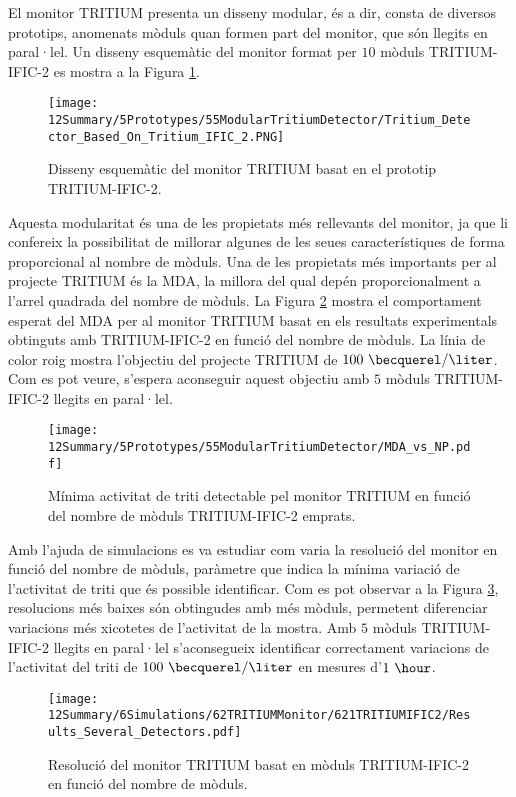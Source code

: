 El monitor TRITIUM presenta un disseny modular, és a dir, consta de diversos prototips, anomenats mòduls quan formen part del monitor, que són llegits en paral·lel. Un disseny esquemàtic del monitor format per $10$ mòduls TRITIUM-IFIC-2 es mostra a la Figura \ref{fig:10TritiumMonitorIFIC2}.
\begin{figure}[h]
\centering
\texttt{[image: 12Summary/5Prototypes/55ModularTritiumDetector/Tritium\_Detector\_Based\_On\_Tritium\_IFIC\_2.PNG]}
\caption{Disseny esquemàtic del monitor TRITIUM basat en el prototip TRITIUM-IFIC-2.\label{fig:10TritiumMonitorIFIC2}}
\end{figure}
Aquesta modularitat és una de les propietats més rellevants del monitor, ja que li confereix la possibilitat de millorar algunes de les seues característiques de forma proporcional al nombre de mòduls. Una de les propietats més importants per al projecte TRITIUM és la MDA, la millora del qual depén proporcionalment a l'arrel quadrada del nombre de mòduls. La Figura \ref{fig:MDATritiumMonitorIFIC2} mostra el comportament esperat del MDA per al monitor TRITIUM basat en els resultats experimentals obtinguts amb TRITIUM-IFIC-2 en funció del nombre de mòduls. La línia de color roig mostra l'objectiu del projecte TRITIUM de $100~\becquerel/\liter$. Com es pot veure, s'espera aconseguir aquest objectiu amb $5$ mòduls TRITIUM-IFIC-2 llegits en paral·lel.

\begin{figure}[h]
\centering
\texttt{[image: 12Summary/5Prototypes/55ModularTritiumDetector/MDA\_vs\_NP.pdf]}
\caption{Mínima activitat de triti detectable pel monitor TRITIUM en funció del nombre de mòduls TRITIUM-IFIC-2 emprats.\label{fig:MDATritiumMonitorIFIC2}}
\end{figure}

Amb l'ajuda de simulacions es va estudiar com varia la resolució del monitor en funció del nombre de mòduls, paràmetre que indica la mínima variació de l'activitat de triti que és possible identificar. Com es pot observar a la Figura \ref{fig:ResolucioTritiumMonitorIFIC2}, resolucions més baixes són obtingudes amb més mòduls, permetent diferenciar variacions més xicotetes de l'activitat de la mostra. Amb $5$ mòduls TRITIUM-IFIC-2 llegits en paral·lel s'aconsegueix identificar correctament variacions de l'activitat del triti de $100~\becquerel/\liter$ en mesures d'$1~\hour$.

\begin{figure}[h]
\centering
\texttt{[image: 12Summary/6Simulations/62TRITIUMMonitor/621TRITIUMIFIC2/Results\_Several\_Detectors.pdf]}
\caption{Resolució del monitor TRITIUM basat en mòduls TRITIUM-IFIC-2 en funció del nombre de mòduls.\label{fig:ResolucioTritiumMonitorIFIC2}}
\end{figure}